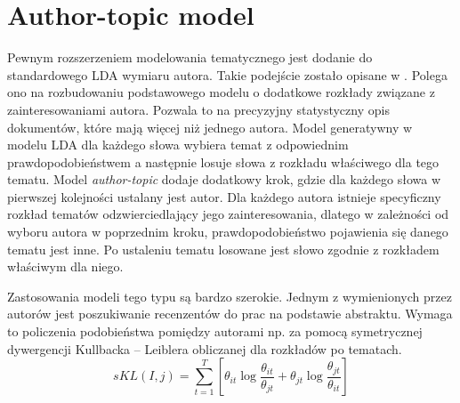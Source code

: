 \documentclass[a4paper,11pt,twoside]{report}
\theoremstyle{definition}
\begin{document}
\section{Author-topic model}
Pewnym rozszerzeniem modelowania tematycznego jest dodanie do standardowego LDA wymiaru autora. Takie podejście zostało opisane w \cite{ATM}. Polega ono na rozbudowaniu podstawowego modelu o dodatkowe rozkłady związane z zainteresowaniami autora. Pozwala to na precyzyjny statystyczny opis dokumentów, które mają więcej niż jednego autora. Model generatywny w modelu LDA dla każdego słowa wybiera temat z odpowiednim prawdopodobieństwem a następnie losuje słowa z rozkładu właściwego dla tego tematu. Model \textit{author-topic} dodaje dodatkowy krok, gdzie dla każdego słowa w pierwszej kolejności ustalany jest autor. Dla każdego autora istnieje specyficzny rozkład tematów odzwierciedlający jego zainteresowania, dlatego w zależności od wyboru autora w poprzednim kroku, prawdopodobieństwo pojawienia się danego tematu jest inne. Po ustaleniu tematu losowane jest słowo zgodnie z rozkładem właściwym dla niego.

Zastosowania modeli tego typu są bardzo szerokie. Jednym z wymienionych przez autorów \cite{ATM} jest poszukiwanie recenzentów do prac na podstawie abstraktu. Wymaga to policzenia podobieństwa pomiędzy autorami np. za pomocą symetrycznej dywergencji Kullbacka – Leiblera obliczanej dla rozkładów po tematach.
\begin{equation}
sKL(I,j) = \sum_{t=1}^T \left[ \theta_{it} \log \frac{\theta_{it}}{\theta_{jt}} + \theta_{jt} \log \frac{\theta_{jt}}{\theta_{it}} \right]
\end{equation} 




\end{document}
